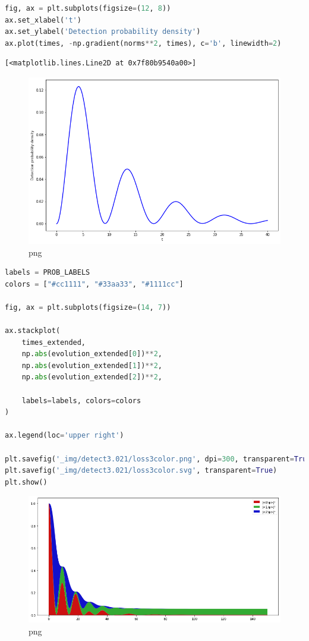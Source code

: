 \begin{lstlisting}[language=Python]
fig, ax = plt.subplots(figsize=(12, 8))
ax.set_xlabel('t')
ax.set_ylabel('Detection probability density')
ax.plot(times, -np.gradient(norms**2, times), c='b', linewidth=2)
\end{lstlisting}

\begin{lstlisting}
[<matplotlib.lines.Line2D at 0x7f80b9540a00>]
\end{lstlisting}

\begin{figure}
\centering
\includegraphics[width=0.666\linewidth]{tex/appendix/nb/jupyter/3lev/output_36_1.png}
\caption{png}
\end{figure}

\begin{lstlisting}[language=Python]
labels = PROB_LABELS
colors = ["#cc1111", "#33aa33", "#1111cc"]

fig, ax = plt.subplots(figsize=(14, 7))

ax.stackplot(
    times_extended,
    np.abs(evolution_extended[0])**2,
    np.abs(evolution_extended[1])**2,
    np.abs(evolution_extended[2])**2,
    
    labels=labels, colors=colors
)

ax.legend(loc='upper right')

plt.savefig('_img/detect3.021/loss3color.png', dpi=300, transparent=True, pad_inches=0)
plt.savefig('_img/detect3.021/loss3color.svg', transparent=True)
plt.show()
\end{lstlisting}

\begin{figure}
\centering
\includegraphics[width=0.666\linewidth]{tex/appendix/nb/jupyter/3lev/output_37_0.png}
\caption{png}
\end{figure}

